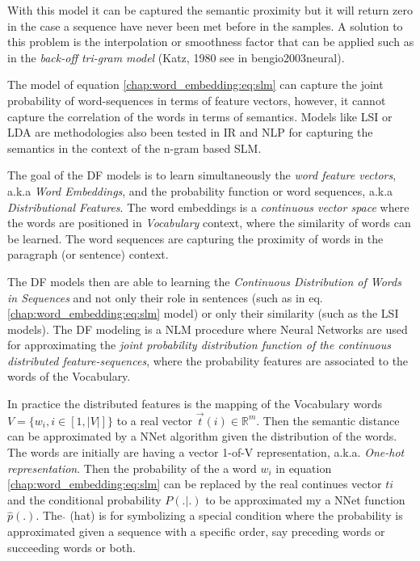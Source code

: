 With this model it can be captured the semantic proximity but it will return zero in the case a sequence have never been met before in the samples. A solution to this problem is the interpolation or smoothness factor that can be applied such as in the \textit{back-off tri-gram model} (Katz, 1980 see in bengio2003neural). 

The model of equation \ref{chap:word_embedding:eq:slm} can capture the joint probability of word-sequences in terms of feature vectors, however, it cannot capture the correlation of the words in terms of semantics. Models like LSI or LDA are methodologies also been tested in IR and NLP for capturing the semantics in the context of the n-gram based SLM. 

The goal of the DF models is to learn simultaneously the \textit{word feature vectors}, a.k.a \textit{Word Embeddings}, and the probability function or word sequences, a.k.a \textit{Distributional Features}. The word embeddings is a \textit{continuous vector space} where the words are positioned in \textit{Vocabulary} context, where the similarity of words can be learned. The word sequences are capturing the proximity of words in the paragraph (or sentence) context.

The DF models then are able to learning the \textit{Continuous Distribution of Words in Sequences} and not only their role in sentences (such as in eq.  \ref{chap:word_embedding:eq:slm} model) or only their similarity (such as the LSI models). The DF modeling is a NLM procedure where Neural Networks are used for approximating the\textit{ joint probability distribution function of the continuous distributed feature-sequences}, where the probability features are associated to the words of the Vocabulary.

In practice the distributed features is the mapping of the Vocabulary words $V = \{w_{i}, i \in [1, |V|] \}$ to a real vector $\vec{t}(i) \in \mathbb{R}^{m}$. Then the semantic distance can be approximated by a NNet algorithm given the distribution of the words. The words are initially are having a vector 1-of-V representation, a.k.a. \textit{One-hot representation}. Then the probability of the a word $w_{i}$ in equation \ref{chap:word_embedding:eq:slm} can be replaced by the real continues vector $t{i}$ and the conditional probability $P(.|.)$ to be approximated my a NNet function $\hat{p}(.)$. The $\hat{}$ (hat) is for symbolizing a special condition where the probability is approximated given a sequence with a specific order, say preceding words or succeeding words or both. 

